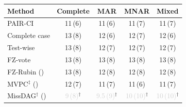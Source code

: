 \begin{tabular}{lcccc}
    \toprule
    Method & Complete & MAR & MNAR & Mixed \\
    \midrule
    PAIR-CI                                           & 11\,{\scriptsize(6)} & 11\,{\scriptsize(6)} & 11\,{\scriptsize(7)} & 11\,{\scriptsize(7)} \\
    Complete case                                     & 13\,{\scriptsize(8)} & 12\,{\scriptsize(6)} & 12\,{\scriptsize(7)} & 12\,{\scriptsize(6)} \\
    Test-wise                                         & 13\,{\scriptsize(8)} & 12\,{\scriptsize(7)} & 12\,{\scriptsize(7)} & 12\,{\scriptsize(7)} \\
    FZ-vote                                           & 13\,{\scriptsize(8)} & 13\,{\scriptsize(8)} & 13\,{\scriptsize(8)} & 13\,{\scriptsize(8)} \\
    FZ-Rubin (\citeauthor{witte2022multiple})         & 13\,{\scriptsize(8)} & 12\,{\scriptsize(8)} & 12\,{\scriptsize(8)} & 12\,{\scriptsize(8)} \\
    MVPC$^\ddagger$ (\citeauthor{tu2019causal})       & 12\,{\scriptsize(7)} & 11\,{\scriptsize(7)} & 11\,{\scriptsize(6)} & 11\,{\scriptsize(7)} \\
    MissDAG$^\dagger$ (\citeauthor{gao2022missdag})   & \textcolor{lightgray}{9\,{\scriptsize(8)}}$^\dagger$ & \textcolor{lightgray}{9.5\,{\scriptsize(9)}}$^\dagger$ & \textcolor{lightgray}{10\,{\scriptsize(10)}}$^\dagger$ & \textcolor{lightgray}{10\,{\scriptsize(10)}}$^\dagger$ \\
    \bottomrule
\end{tabular}
